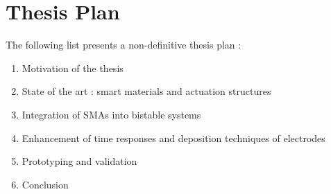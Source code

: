 \section{Thesis Plan}
The following list presents a non-definitive thesis plan :
\begin{enumerate}
  \item Motivation of the thesis
  \item State of the art : smart materials and actuation structures
  \item Integration of SMAs into bistable systems
  \item Enhancement of time responses and deposition techniques of electrodes
  \item Prototyping and validation
  \item Conclusion
\end{enumerate}
